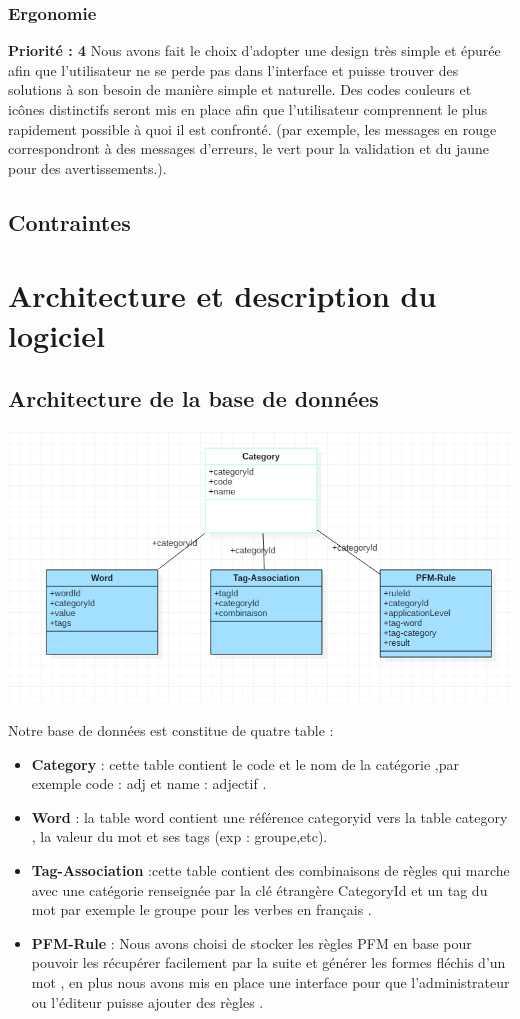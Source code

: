 \documentclass[12pt,a4paper]{article}
\begin{document}
\subsubsection{Ergonomie}
\textbf{Priorité : 4}
\smallbreak
Nous avons fait le choix d'adopter une design très simple et épurée afin que l'utilisateur ne se perde pas dans l'interface et puisse trouver des solutions à son besoin de manière simple et naturelle.
\smallbreak
Des codes couleurs et icônes distinctifs seront mis en place afin que l'utilisateur comprennent le plus rapidement possible à quoi il est confronté. (par exemple, les messages en rouge correspondront à des messages d'erreurs, le vert pour la validation et du jaune pour des avertissements.).

\subsection{Contraintes}

\section{Architecture et description du logiciel}
\subsection{Architecture de la base de données }
\begin{center}\includegraphics[width=150mm]{img/basefinal.png}\end{center}
Notre base de données est constitue de quatre table : 
\begin{itemize}
\item \textbf{Category} : cette table contient le code et le nom de la catégorie ,par exemple code : adj et name : adjectif .
\item \textbf{Word} : la table word contient une référence categoryid vers la table category , la valeur du mot et ses tags (exp : groupe,etc).
\item \textbf{Tag-Association} :cette table contient des combinaisons de règles qui marche avec une catégorie renseignée par la clé étrangère CategoryId  et un tag du mot par exemple le groupe pour les verbes en français .
\item \textbf{PFM-Rule} : Nous avons choisi de stocker les règles PFM en base pour pouvoir les récupérer facilement par la suite et générer les formes fléchis d'un mot , en plus nous avons mis en place une interface pour que l'administrateur ou l'éditeur puisse ajouter des règles .

\end{itemize}
\end{document}
